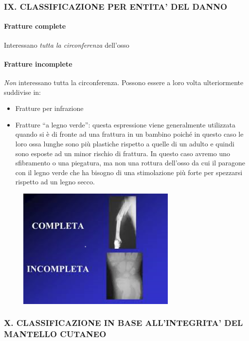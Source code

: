 \subsubsection{IX. CLASSIFICAZIONE PER ENTITA' DEL DANNO}

\paragraph{Fratture complete}
Interessano \emph{tutta la circonferenza} dell'osso
\paragraph{Fratture incomplete} 
\emph{Non} interessano tutta la circonferenza. Possono essere a loro volta ulteriormente suddivise in:

\begin{itemize}
\item
  Fratture per infrazione
\item
  Fratture ``a legno verde'': questa espressione viene generalmente utilizzata quando si è di fronte ad una frattura in un bambino poiché in questo caso le loro ossa lunghe sono più plastiche rispetto a quelle di un adulto e quindi sono esposte ad un minor rischio di frattura. In questo caso avremo uno sfibramento o una piegatura, ma non una rottura dell'osso da cui il paragone con il legno verde che ha bisogno di una stimolazione più forte per spezzarsi rispetto ad un legno secco.
\end{itemize}


\begin{figure}[!ht]
\centering
\includegraphics[width=0.7\textwidth]{002/image8.png}
\end{figure}

\subsubsection{X. CLASSIFICAZIONE IN BASE ALL'INTEGRITA' DEL MANTELLO CUTANEO}

